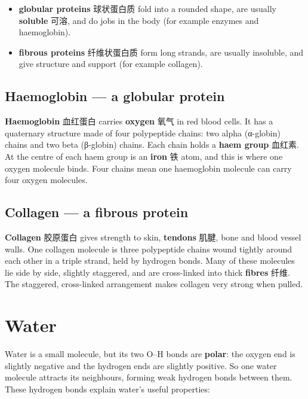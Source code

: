 \documentclass[11pt]{article}
\begin{document}
\begin{itemize}
\item \textbf{globular proteins} 球状蛋白质 fold into a rounded shape, are usually \textbf{soluble} 可溶, and do jobs in the body (for example enzymes and haemoglobin).

\item \textbf{fibrous proteins} 纤维状蛋白质 form long strands, are usually insoluble, and give structure and support (for example collagen).

\end{itemize}

\subsection*{Haemoglobin — a globular protein}

\textbf{Haemoglobin} 血红蛋白 carries \textbf{oxygen} 氧气 in red blood cells. It has a quaternary structure made of four polypeptide chains: two alpha (α-globin) chains and two beta (β-globin) chains. Each chain holds a \textbf{haem group} 血红素. At the centre of each haem group is an \textbf{iron} 铁 atom, and this is where one oxygen molecule binds. Four chains mean one haemoglobin molecule can carry four oxygen molecules.

\subsection*{Collagen — a fibrous protein}

\textbf{Collagen} 胶原蛋白 gives strength to skin, \textbf{tendons} 肌腱, bone and blood vessel walls. One collagen molecule is three polypeptide chains wound tightly around each other in a triple strand, held by hydrogen bonds. Many of these molecules lie side by side, slightly staggered, and are cross-linked into thick \textbf{fibres} 纤维. The staggered, cross-linked arrangement makes collagen very strong when pulled.

\section*{Water}

Water is a small molecule, but its two O–H bonds are \textbf{polar}: the oxygen end is slightly negative and the hydrogen ends are slightly positive. So one water molecule attracts its neighbours, forming weak hydrogen bonds between them. These hydrogen bonds explain water's useful properties:
\end{document}
